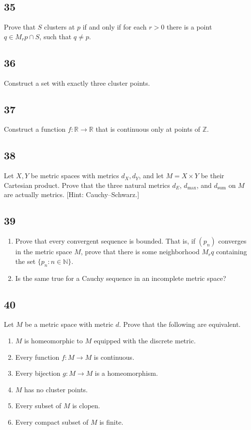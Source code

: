 \documentclass{amsart}
\begin{document}
\subsection*{35}
Prove that $S$ clusters at $p$ if and only if for each $r>0$ there is a point $q \in M_r p \cap S$, such that $q \ne p$.

\subsection*{36}
Construct a set with exactly three cluster points.

\subsection*{37}
Construct a function $f : \mathbb{R} \to \mathbb{R}$ that is continuous only at points of $\mathbb{Z}$.

\subsection*{38}
Let $X, Y$ be metric spaces with metrics $d_X, d_Y$, and let $M = X \times Y$ be their Cartesian product. Prove that the three natural metrics $d_E$, $d_{\max}$, and $d_{\mathrm{sum}}$ on $M$ are actually metrics. [Hint: Cauchy--Schwarz.]

\subsection*{39}
\begin{enumerate}[label=(\alph*)]
\item Prove that every convergent sequence is bounded. That is, if $(p_n)$ converges in the metric space $M$, prove that there is some neighborhood $M_r q$ containing the set $\{p_n : n \in \mathbb{N}\}$.
\item Is the same true for a Cauchy sequence in an incomplete metric space?
\end{enumerate}

\subsection*{40}
Let $M$ be a metric space with metric $d$. Prove that the following are equivalent.
\begin{enumerate}[label=(\alph*)]
\item $M$ is homeomorphic to $M$ equipped with the discrete metric.
\item Every function $f : M \to M$ is continuous.
\item Every bijection $g : M \to M$ is a homeomorphism.
\item $M$ has no cluster points.
\item Every subset of $M$ is clopen.
\item Every compact subset of $M$ is finite.
\end{enumerate}
\end{document}
